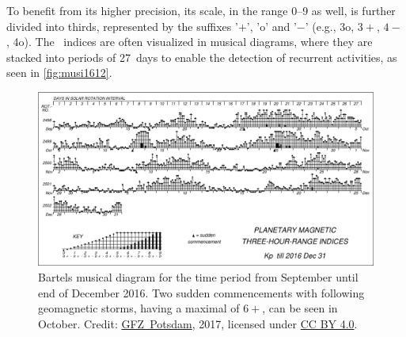 To benefit from its higher precision, its scale, in the range 0--9 as well, is further divided into thirds, represented by the suffixes '$+$', 'o' and '$-$' (e.g., 3o, $3+$, $4-$, 4o). The \Kp{}~indices are often visualized in musical diagrams, where they are stacked into periods of 27~days to enable the detection of recurrent activities, as seen in \autoref{fig:musi1612}.
\begin{figure}[htb]
	\centering
	\includegraphics[width=\textwidth]{figures_of_others/images/musi1612.pdf}
	\caption[Credit: \href{http://www.gfz-potsdam.de/en/kp-index/}{GFZ~Potsdam}, 2017, licensed under \href{https://creativecommons.org/licenses/by/4.0/}{CC BY 4.0}.]
	{Bartels musical \Kp{} diagram for the time period from September until end of December 2016. Two sudden commencements with following geomagnetic storms, having a maximal \Kp{} of $6+$, can be seen in October. Credit: \href{http://www.gfz-potsdam.de/en/kp-index/}{GFZ~Potsdam}, 2017, licensed under \href{https://creativecommons.org/licenses/by/4.0/}{CC BY 4.0}.}
	\label{fig:musi1612}
\end{figure}

